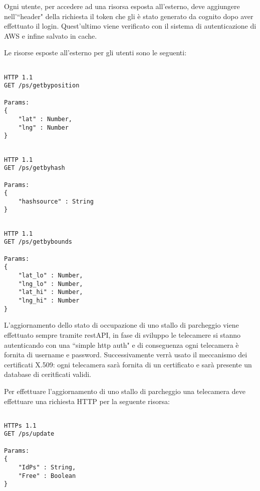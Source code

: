 \vspace{1.5truecm}
Ogni utente, per accedere ad una risorsa esposta all'esterno, deve aggiungere nell'``header" della richiesta il token che gli è stato generato da cognito dopo aver effettuato il login. Quest'ultimo viene verificato con il sistema di autenticazione di AWS e infine salvato in cache. 

Le risorse esposte all'esterno per gli utenti sono le seguenti:

\lstset{language=HTTP}          

\begin{lstlisting}[frame=single]

HTTP 1.1 
GET /ps/getbyposition

Params:
{
	"lat" : Number,
	"lng" : Number
}

\end{lstlisting}

\vspace{0.5truecm}
\begin{lstlisting}[frame=single]

HTTP 1.1 
GET /ps/getbyhash

Params:
{
	"hashsource" : String
}

\end{lstlisting}

\vspace{0.5truecm}
\begin{lstlisting}[frame=single]

HTTP 1.1 
GET /ps/getbybounds

Params:
{
	"lat_lo" : Number,
	"lng_lo" : Number,
	"lat_hi" : Number,
	"lng_hi" : Number
}

\end{lstlisting}
\vspace{0.5truecm}
L'aggiornamento dello stato di occupazione di uno stallo di parcheggio viene effettuato sempre tramite restAPI, in fase di sviluppo le telecamere si stanno autenticando con una ``simple http auth" e di conseguenza ogni telecamera è fornita di username e password. Successivamente verrà usato il meccanismo dei certificati X.509: ogni telecamera sarà fornita di un certificato e sarà presente un database di ceritficati validi.


Per effettuare l'aggiornamento di uno stallo di parcheggio una telecamera deve effettuare una richiesta HTTP per la seguente risorsa:
\vspace{0.5truecm}

\begin{lstlisting}[frame=single]

HTTPs 1.1 
GET /ps/update

Params:
{
	"IdPs" : String,
	"Free" : Boolean
}

\end{lstlisting}
\vspace{0.5truecm}

